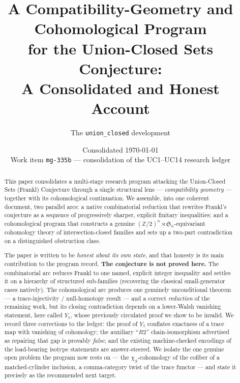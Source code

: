 \documentclass[11pt,oneside]{amsart}
\title[A Program for the Union-Closed Sets Conjecture]{%
  A Compatibility-Geometry and Cohomological Program\\
  for the Union-Closed Sets Conjecture:\\
  A Consolidated and Honest Account}
\author{The \texttt{union\_closed} development}
\date{Consolidated \today\\[2pt]
  \normalfont\small Work item \texttt{mg-335b} --- consolidation of the
  UC1--UC14 research ledger}
\theoremstyle{plain}
\theoremstyle{definition}
\theoremstyle{remark}
\theoremstyle{honeststyle}
\newcommand{\Sym}{\mathfrak{S}}
\newcommand{\Z}{\mathbb{Z}}
\newcommand{\walsh}[1]{\chi_{#1}}
\begin{document}
\begin{abstract}
This paper consolidates a multi-stage research program attacking the
Union-Closed Sets (Frankl) Conjecture through a single structural lens
--- \emph{compatibility geometry} --- together with its cohomological
continuation. We assemble, into one coherent document, two parallel
arcs: a native combinatorial reduction that rewrites Frankl's
conjecture as a sequence of progressively sharper, explicit finitary
inequalities; and a cohomological program that constructs a genuine
$(\Z/2)^n\!\rtimes\!\Sym_n$-equivariant cohomology theory of
intersection-closed families and sets up a two-part contradiction on a
distinguished obstruction class.

The paper is written to be \emph{honest about its own state}, and that
honesty is its main contribution to the program record. \textbf{The
conjecture is not proved here.} The combinatorial arc reduces Frankl to
one named, explicit integer inequality and settles it on a hierarchy of
structured sub-families (recovering the classical small-generator cases
natively). The cohomological arc produces one genuinely unconditional
theorem --- a trace-injectivity / null-homotopy result --- and a
correct \emph{reduction} of the remaining work, but its closing
contradiction depends on a lower-Walsh vanishing statement, here called
$Y_1$, whose previously circulated proof we show to be invalid. We
record three corrections to the ledger: the proof of $Y_1$ conflates
exactness of a trace map with vanishing of cohomology; the auxiliary
``$R2$'' chain-isomorphism advertised as repairing that gap is provably
\emph{false}; and the existing machine-checked encodings of the
load-bearing isotype statements are answer-steered. We isolate the one
genuine open problem the program now rests on --- the
$\walsh{S}$-cohomology of the cofiber of a matched-cylinder inclusion,
a comma-category twist of the trace functor --- and state it precisely
as the recommended next target.
\end{abstract}

\maketitle

\setcounter{tocdepth}{2}
\tableofcontents












\end{document}
